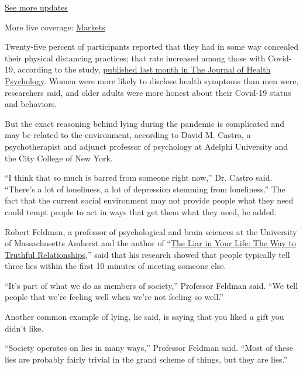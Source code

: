 \href{https://www.nytimes3xbfgragh.onion/2020/09/11/world/covid-19-coronavirus.html?action=click\&pgtype=Article\&state=default\&region=MAIN_CONTENT_1\&context=storylines_live_updates}{See
more updates}

More live coverage:
\href{https://www.nytimes3xbfgragh.onion/live/2020/09/11/business/stock-market-today-coronavirus?action=click\&pgtype=Article\&state=default\&region=MAIN_CONTENT_1\&context=storylines_live_updates}{Markets}

Twenty-five percent of participants reported that they had in some way
concealed their physical distancing practices; that rate increased among
those with Covid-19, according to the study,
\href{https://journals.sagepub.com/doi/10.1177/1359105320951603}{published
last month in The Journal of Health Psychology}. Women were more likely
to disclose health symptoms than men were, researchers said, and older
adults were more honest about their Covid-19 status and behaviors.

But the exact reasoning behind lying during the pandemic is complicated
and may be related to the environment, according to David M. Castro, a
psychotherapist and adjunct professor of psychology at Adelphi
University and the City College of New York.

``I think that so much is barred from someone right now,'' Dr. Castro
said. ``There's a lot of loneliness, a lot of depression stemming from
loneliness.'' The fact that the current social environment may not
provide people what they need could tempt people to act in ways that get
them what they need, he added.

Robert Feldman, a professor of psychological and brain sciences at the
University of Massachusetts Amherst and the author of
``\href{https://www.hachettebookgroup.com/titles/robert-feldman/the-liar-in-your-life/9780446552196/}{The
Liar in Your Life: The Way to Truthful Relationships},'' said that his
research showed that people typically tell three lies within the first
10 minutes of meeting someone else.

``It's part of what we do as members of society,'' Professor Feldman
said. ``We tell people that we're feeling well when we're not feeling so
well.''

Another common example of lying, he said, is saying that you liked a
gift you didn't like.

``Society operates on lies in many ways,'' Professor Feldman said.
``Most of these lies are probably fairly trivial in the grand scheme of
things, but they are lies.''

